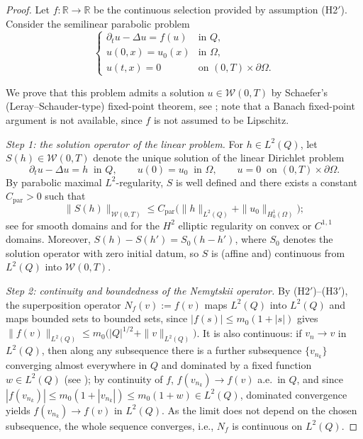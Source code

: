 \documentclass[11pt]{elsarticle}
\theoremstyle{definition}
\theoremstyle{remark}
\numberwithin{equation}{section}
\begin{document}
\begin{proof}
	Let $f:\mathbb{R}\to\mathbb{R}$ be the continuous selection provided
	by assumption \textup{(H2$'$)}. Consider the semilinear parabolic
	problem
	\[
	\begin{cases}
		\partial_t u-\Delta u=f(u)
		& \text{in } Q,
		\\
		u(0,x)=u_0(x)
		& \text{in } \Omega,
		\\
		u(t,x)=0
		& \text{on } (0,T)\times\partial\Omega.
	\end{cases}
	\]
	
	We prove that this problem admits a solution $u\in\mathcal{W}(0,T)$ by
	Schaefer's (Leray--Schauder-type) fixed-point theorem, see
	\cite[Section~9.2.2, Theorem~4]{Evans}; note that a Banach fixed-point
	argument is not available, since $f$ is not assumed to be Lipschitz.
	
	\emph{Step 1: the solution operator of the linear problem.}
	For $h\in L^2(Q)$, let $S(h)\in\mathcal{W}(0,T)$ denote the unique
	solution of the linear Dirichlet problem
	\[
	\partial_t u-\Delta u=h \ \text{ in } Q,
	\qquad u(0)=u_0 \ \text{ in }\Omega,
	\qquad u=0 \ \text{ on }(0,T)\times\partial\Omega.
	\]
	By parabolic maximal $L^2$-regularity, $S$ is well defined and there
	exists a constant $C_{\mathrm{par}}>0$ such that
	\begin{equation}\label{eq:max-reg-linear}
		\|S(h)\|_{\mathcal{W}(0,T)}
		\le
		C_{\mathrm{par}}\bigl(\|h\|_{L^2(Q)}+\|u_0\|_{H_0^1(\Omega)}\bigr);
	\end{equation}
	see \cite[Section~7.1.3, Theorem~5]{Evans} for smooth domains and
	\cite[Theorem~3.2.1.2]{Grisvard1985} for the $H^2$ elliptic regularity
	on convex or $C^{1,1}$ domains. Moreover, $S(h)-S(h')=S_0(h-h')$, where
	$S_0$ denotes the solution operator with zero initial datum, so $S$ is
	(affine and) continuous from $L^2(Q)$ into $\mathcal{W}(0,T)$.
	
	\emph{Step 2: continuity and boundedness of the Nemytskii operator.}
	By \textup{(H2$'$)}--\textup{(H3$'$)}, the superposition operator
	$N_f(v):=f(v)$ maps $L^2(Q)$ into $L^2(Q)$ and maps bounded sets to
	bounded sets, since $|f(s)|\le m_0(1+|s|)$ gives
	$\|f(v)\|_{L^2(Q)}\le m_0\bigl(|Q|^{1/2}+\|v\|_{L^2(Q)}\bigr)$. It is
	also continuous: if $v_n\to v$ in $L^2(Q)$, then along any subsequence
	there is a further subsequence $\{v_{n_k}\}$ converging almost
	everywhere in $Q$ and dominated by a fixed function $w\in L^2(Q)$
	(see \cite[Theorem~4.9]{brezis_2011}); by continuity of $f$,
	$f(v_{n_k})\to f(v)$ a.e.\ in $Q$, and since
	$|f(v_{n_k})|\le m_0(1+|v_{n_k}|)\le m_0(1+w)\in L^2(Q)$, dominated
	convergence yields $f(v_{n_k})\to f(v)$ in $L^2(Q)$. As the limit does
	not depend on the chosen subsequence, the whole sequence converges,
	i.e., $N_f$ is continuous on $L^2(Q)$.
	

\end{proof}
\end{document}

